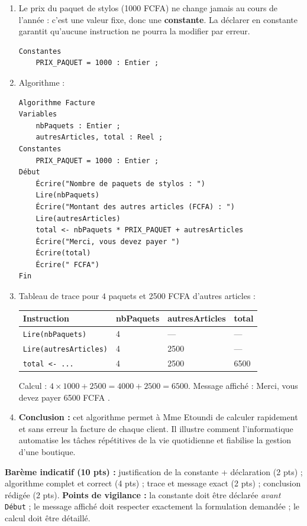 \documentclass[11pt]{article}
\begin{document}
\begin{corrige}
\begin{enumerate}
\item Le prix du paquet de stylos (1000 FCFA) ne change jamais au cours de l'année : c'est une valeur fixe, donc une \textbf{constante}. La déclarer en constante garantit qu'aucune instruction ne pourra la modifier par erreur.
\begin{lstlisting}
Constantes
    PRIX_PAQUET = 1000 : Entier ;
\end{lstlisting}
\item Algorithme :
\begin{lstlisting}
Algorithme Facture
Variables
    nbPaquets : Entier ;
    autresArticles, total : Reel ;
Constantes
    PRIX_PAQUET = 1000 : Entier ;
Début
    Écrire("Nombre de paquets de stylos : ")
    Lire(nbPaquets)
    Écrire("Montant des autres articles (FCFA) : ")
    Lire(autresArticles)
    total <- nbPaquets * PRIX_PAQUET + autresArticles
    Écrire("Merci, vous devez payer ")
    Écrire(total)
    Écrire(" FCFA")
Fin
\end{lstlisting}
\item Tableau de trace pour $4$ paquets et 2500 FCFA d'autres articles :
\begin{center}
\begin{tabularx}{\linewidth}{|l|X|X|X|}
\hline
\rowcolor{popblueL} \textbf{Instruction} & \textbf{nbPaquets} & \textbf{autresArticles} & \textbf{total} \\
\hline
\texttt{Lire(nbPaquets)} & 4 & --- & --- \\
\hline
\texttt{Lire(autresArticles)} & 4 & 2500 & --- \\
\hline
\texttt{total <- ...} & 4 & 2500 & 6500 \\
\hline
\end{tabularx}
\end{center}
Calcul : $4 \times 1000 + 2500 = 4000 + 2500 = 6500$. Message affiché : \og Merci, vous devez payer 6500 FCFA \fg.
\item \textbf{Conclusion :} cet algorithme permet à Mme Etoundi de calculer rapidement et sans erreur la facture de chaque client. Il illustre comment l'informatique automatise les tâches répétitives de la vie quotidienne et fiabilise la gestion d'une boutique.
\end{enumerate}
\textbf{Barème indicatif (10 pts) :} justification de la constante + déclaration (2 pts) ; algorithme complet et correct (4 pts) ; trace et message exact (2 pts) ; conclusion rédigée (2 pts).
\textbf{Points de vigilance :} la constante doit être déclarée \emph{avant} \texttt{Début} ; le message affiché doit respecter exactement la formulation demandée ; le calcul doit être détaillé.
\end{corrige}
\end{document}
